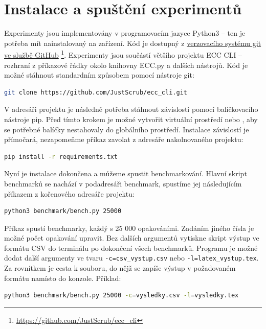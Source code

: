 \documentclass{article}
\theoremstyle{definition}
\begin{document}
\section{Instalace a spuštění experimentů}
Experimenty jsou implementovány v programovacím jazyce Python3 -- ten je potřeba mít nainstalovaný na zařízení. Kód je dostupný z \href{https://github.com/JustScrub/ecc_cli}{verzovacího systému git ve službě GitHub} \footnote{\url{https://github.com/JustScrub/ecc_cli}}. Experimenty jsou součástí většího projektu ECC CLI -- rozhraní z příkazové řádky okolo knihovny ECC.py a dalších nástrojů. Kód je možné stáhnout standardním způsobem pomocí nástroje git:

\begin{lstlisting}[language=bash]
    git clone https://github.com/JustScrub/ecc_cli.git 
\end{lstlisting}

V adresáři projektu je následně potřeba stáhnout závislosti pomocí balíčkovacího nástroje pip. Před tímto krokem je možné vytvořit virtuální prostředí  nebo , aby se potřebné balíčky nestahovaly do globálního prostředí. Instalace závislostí je přímočará, nezapomeňme příkaz zavolat z adresáře nakolnovaného projektu:

\begin{lstlisting}[language=bash]
    pip install -r requirements.txt 
\end{lstlisting}

Nyní je instalace dokončena a můžeme spustit benchmarkování. Hlavní skript benchmarků se nachází v podadresáři benchmark, spustíme jej následujícím příkazem z kořenového adresáře projektu:

\begin{lstlisting}[language=bash]
    python3 benchmark/bench.py 25000
\end{lstlisting}

Příkaz spustí benchmarky, každý s 25 000 opakováními. Zadáním jiného čísla je možné počet opakování upravit. Bez dalších argumentů vytiskne skript výstup ve formátu CSV do terminálu po dokončení všech benchmarků. Programu je možné dodat další argumenty ve tvaru \verb|-c=csv_vystup.csv| nebo \verb|-l=latex_vystup.tex|. Za rovnítkem je cesta k souboru, do nějž se zapíše výstup v požadovaném formátu namísto do konzole. Příklad:

\begin{lstlisting}[language=bash]
    python3 benchmark/bench.py 25000 -c=vysledky.csv -l=vysledky.tex
\end{lstlisting}
\end{document}
